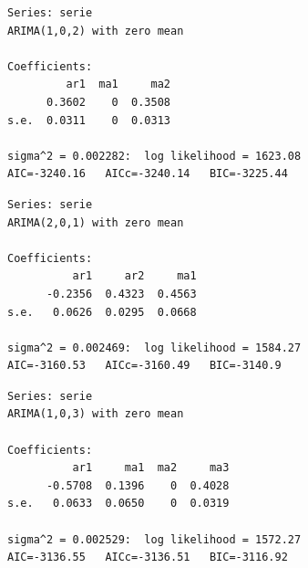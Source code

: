 \documentclass[
  12pt,
  a4paper]{article}
\newenvironment{Shaded}{\begin{snugshade}}{\end{snugshade}}
\newcommand{\AttributeTok}[1]{\textcolor[rgb]{0.77,0.63,0.00}{#1}}
\newcommand{\FunctionTok}[1]{\textcolor[rgb]{0.00,0.00,0.00}{#1}}
\newcommand{\NormalTok}[1]{#1}
\newcommand{\SpecialCharTok}[1]{\textcolor[rgb]{0.00,0.00,0.00}{#1}}
\begin{document}
\begin{Shaded}
\end{Shaded}

\begin{verbatim}
Series: serie 
ARIMA(1,0,2) with zero mean 

Coefficients:
         ar1  ma1     ma2
      0.3602    0  0.3508
s.e.  0.0311    0  0.0313

sigma^2 = 0.002282:  log likelihood = 1623.08
AIC=-3240.16   AICc=-3240.14   BIC=-3225.44
\end{verbatim}

\begin{Shaded}
\end{Shaded}

\begin{verbatim}
Series: serie 
ARIMA(2,0,1) with zero mean 

Coefficients:
          ar1     ar2     ma1
      -0.2356  0.4323  0.4563
s.e.   0.0626  0.0295  0.0668

sigma^2 = 0.002469:  log likelihood = 1584.27
AIC=-3160.53   AICc=-3160.49   BIC=-3140.9
\end{verbatim}

\begin{Shaded}
\end{Shaded}

\begin{verbatim}
Series: serie 
ARIMA(1,0,3) with zero mean 

Coefficients:
          ar1     ma1  ma2     ma3
      -0.5708  0.1396    0  0.4028
s.e.   0.0633  0.0650    0  0.0319

sigma^2 = 0.002529:  log likelihood = 1572.27
AIC=-3136.55   AICc=-3136.51   BIC=-3116.92
\end{verbatim}

\begin{Shaded}
\end{Shaded}
\end{document}
